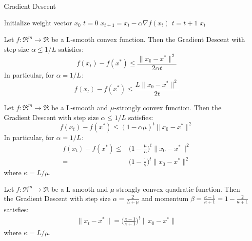 \begin{algorithm}[H]
	\caption{Gradient Descent}
	\label{alg:gd}
	\begin{algorithmic}
			\State Initialize weight vector $x_0$
			\State $t = 0$
				\State $x_{t+1} = x_t - \alpha \nabla f(x_t)$
				\State $t = t + 1$
			\EndWhile
			\State \Return $x_t$
		\EndFunction
	\end{algorithmic}
\end{algorithm}

\begin{theorem} \label{thm:cvx_gd_convergence}
Let $f: \Re^m \rightarrow \Re$ be a L-smooth convex function. Then the Gradient Descent with step size $\alpha \leq 1/L$ satisfies:
$$
f(x_t) - f(x^*) \leq \frac{\| x_0 - x^* \|^2}{2 \alpha t}
$$
In particular, for $\alpha = 1/L$:
$$
f(x_t) - f(x^*) \leq \frac{L \| x_0 - x^* \|^2}{2 t}
$$
\end{theorem}

\begin{theorem} \label{thm:str_cvx_gd_convergence}
Let $f: \Re^m \rightarrow \Re$ be a L-smooth and $\mu$-strongly convex function. Then the Gradient Descent with step size $\alpha \leq 1/L$ satisfies:
$$
f(x_t) - f(x^*) \leq (1 - \alpha \mu)^t \| x_0 - x^* \|^2
$$
In particular, for $\alpha = 1/L$:
$$
\begin{aligned}
	f(x_t) - f(x^*) \leq & \bigg(1 - \frac{\mu}{L}\bigg)^t \| x_0 - x^* \|^2 \\
						= & \bigg(1 - \frac{1}{\kappa}\bigg)^t \| x_0 - x^* \|^2
\end{aligned}
$$
where $\kappa = L/\mu$.
\end{theorem}

\begin{theorem} \label{thm:quad_gd_convergence}
Let $f: \Re^m \rightarrow \Re$ be a L-smooth and $\mu$-strongly convex quadratic function. Then the Gradient Descent with step size $\alpha = \displaystyle \frac{2}{L + \mu}$ and momentum $\beta = \displaystyle \frac{\kappa-1}{\kappa+1} = 1 - \frac{2}{\kappa+1}$ satisfies:
$$
\begin{aligned}
	\| x_t - x^* \| = \bigg(\frac{\kappa-1}{\kappa+1}\bigg)^t \| x_0 - x^* \|
\end{aligned}
$$
where $\kappa = L/\mu$.
\end{theorem}

